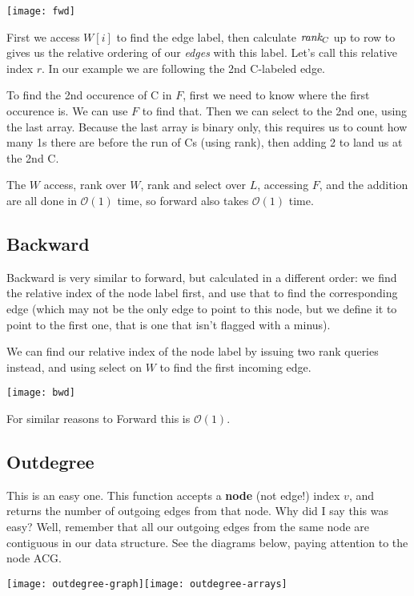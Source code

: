 \medskip\centerline{\texttt{[image: fwd]}}\medskip

First we access $W[i]$ to find the edge label, then calculate $\textit{rank}_C$ up to row to gives us the relative ordering of our \emph{edges} with this label. Let's call this relative index $r$. In our example we are following the 2nd C-labeled edge.

To find the 2nd occurence of C in $F$, first we need to know where the first occurence is. We can use $F$ to find that. Then we can select to the 2nd one, using the last array. Because the last array is binary only, this requires us to count how many 1s there are before the run of Cs (using rank), then adding 2 to land us at the 2nd C.

The $W$ access, rank over $W$, rank and select over $L$, accessing $F$, and the addition are all done in $\mathcal{O}(1)$ time, so forward also takes $\mathcal{O}(1)$ time.

\subsection{Backward}\label{bl-sec:bwd}

Backward is very similar to forward, but calculated in a different order: we find the relative index of the node label first, and use that to find the corresponding edge (which may not be the only edge to point to this node, but we define it to point to the first one, that is one that isn't flagged with a minus).

We can find our relative index of the node label by issuing two rank queries instead, and using select on $W$ to find the first incoming edge.

\medskip\centerline{\texttt{[image: bwd]}}\medskip

For similar reasons to Forward this is $\mathcal{O}(1)$.

\subsection{Outdegree}\label{bl-sec:out}

This is an easy one. This function accepts a {\bf node} (not edge!) index $v$, and returns the number of outgoing edges from that node. Why did I say this was easy? Well, remember that all our outgoing edges from the same node are contiguous in our data structure. See the diagrams below, paying attention to the node ACG.

\medskip\centerline{\texttt{[image: outdegree-graph]}\hfill\texttt{[image: outdegree-arrays]}}\medskip
 
